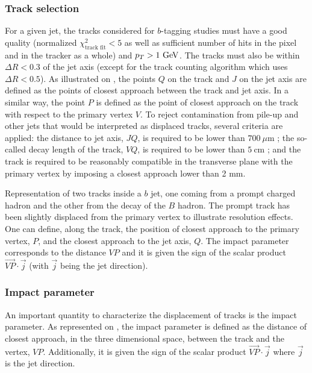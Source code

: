     \subsubsection{Track selection}

    For a given jet, the tracks considered for $b$-tagging studies must have
    a good quality (normalized $\chi^2_\text{track fit} < 5$ as well as sufficient number of hits in the
    pixel and in the tracker as a whole) and $p_T > 1~\text{GeV}$. The tracks must also be within
    $\Delta R < 0.3$ of the jet axis (except for the track counting algorithm which uses $\Delta R < 0.5$).
    As illustrated on , the points $Q$ on the track
    and $J$ on the jet axis are defined as the points of closest approach between the
    track and jet axis. In a similar way, the point $P$ is defined as the point of closest
    approach on the track with respect to the primary vertex $V$. To reject contamination
    from pile-up and other jets that would be interpreted as displaced tracks, several
    criteria are applied: the distance to jet axis, $JQ$, is required to be lower than
    $700~{\mu\text{m}}$ ; the so-called decay length of the track, $VQ$, is required to
    be lower than $5~\text{cm}$ ; and the track is required to be reasonably compatible
    in the transverse plane with the primary vertex by imposing a closest approach lower
    than 2 mm.

                 {Representation of two tracks inside a $b$ jet, one coming from a prompt
                 charged hadron and the other from the decay of
                 the $B$ hadron. The prompt track has been slightly displaced from the primary vertex
                 to illustrate resolution effects. One can define, along the track, the position
                 of closest approach to the primary vertex, $P$, and the closest approach
                 to the jet axis, $Q$. The impact parameter corresponds to the distance $VP$
                 and it is given the sign of the scalar product $\vec{VP} \cdot \vec{j}$ (with
                 $\vec{j}$ being the jet direction).}

    \subsubsection{Impact parameter}

    An important quantity to characterize the displacement of tracks is the impact parameter.
    As represented on , the impact parameter is defined
    as the distance of closest approach, in the three dimensional space, between the track
    and the vertex, $VP$. Additionally, it is given the sign of the scalar product $\vec{VP}
    \cdot \vec{j}$ where $\vec{j}$ is the jet direction.

